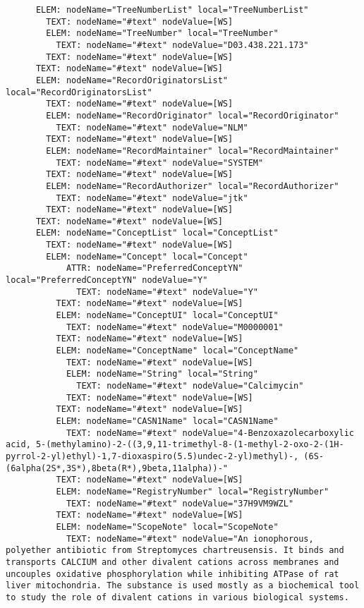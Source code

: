 \documentclass[11pt,english]{article}
\begin{document}
\begin{enumerate}
\begin{lstlisting}
      ELEM: nodeName="TreeNumberList" local="TreeNumberList"
        TEXT: nodeName="#text" nodeValue=[WS]
        ELEM: nodeName="TreeNumber" local="TreeNumber"
          TEXT: nodeName="#text" nodeValue="D03.438.221.173"
        TEXT: nodeName="#text" nodeValue=[WS]
      TEXT: nodeName="#text" nodeValue=[WS]
      ELEM: nodeName="RecordOriginatorsList" local="RecordOriginatorsList"
        TEXT: nodeName="#text" nodeValue=[WS]
        ELEM: nodeName="RecordOriginator" local="RecordOriginator"
          TEXT: nodeName="#text" nodeValue="NLM"
        TEXT: nodeName="#text" nodeValue=[WS]
        ELEM: nodeName="RecordMaintainer" local="RecordMaintainer"
          TEXT: nodeName="#text" nodeValue="SYSTEM"
        TEXT: nodeName="#text" nodeValue=[WS]
        ELEM: nodeName="RecordAuthorizer" local="RecordAuthorizer"
          TEXT: nodeName="#text" nodeValue="jtk"
        TEXT: nodeName="#text" nodeValue=[WS]
      TEXT: nodeName="#text" nodeValue=[WS]
      ELEM: nodeName="ConceptList" local="ConceptList"
        TEXT: nodeName="#text" nodeValue=[WS]
        ELEM: nodeName="Concept" local="Concept"
            ATTR: nodeName="PreferredConceptYN" local="PreferredConceptYN" nodeValue="Y"
              TEXT: nodeName="#text" nodeValue="Y"
          TEXT: nodeName="#text" nodeValue=[WS]
          ELEM: nodeName="ConceptUI" local="ConceptUI"
            TEXT: nodeName="#text" nodeValue="M0000001"
          TEXT: nodeName="#text" nodeValue=[WS]
          ELEM: nodeName="ConceptName" local="ConceptName"
            TEXT: nodeName="#text" nodeValue=[WS]
            ELEM: nodeName="String" local="String"
              TEXT: nodeName="#text" nodeValue="Calcimycin"
            TEXT: nodeName="#text" nodeValue=[WS]
          TEXT: nodeName="#text" nodeValue=[WS]
          ELEM: nodeName="CASN1Name" local="CASN1Name"
            TEXT: nodeName="#text" nodeValue="4-Benzoxazolecarboxylic acid, 5-(methylamino)-2-((3,9,11-trimethyl-8-(1-methyl-2-oxo-2-(1H-pyrrol-2-yl)ethyl)-1,7-dioxaspiro(5.5)undec-2-yl)methyl)-, (6S-(6alpha(2S*,3S*),8beta(R*),9beta,11alpha))-"
          TEXT: nodeName="#text" nodeValue=[WS]
          ELEM: nodeName="RegistryNumber" local="RegistryNumber"
            TEXT: nodeName="#text" nodeValue="37H9VM9WZL"
          TEXT: nodeName="#text" nodeValue=[WS]
          ELEM: nodeName="ScopeNote" local="ScopeNote"
            TEXT: nodeName="#text" nodeValue="An ionophorous, polyether antibiotic from Streptomyces chartreusensis. It binds and transports CALCIUM and other divalent cations across membranes and uncouples oxidative phosphorylation while inhibiting ATPase of rat liver mitochondria. The substance is used mostly as a biochemical tool to study the role of divalent cations in various biological systems.

\end{lstlisting}
\end{enumerate}
\end{document}
